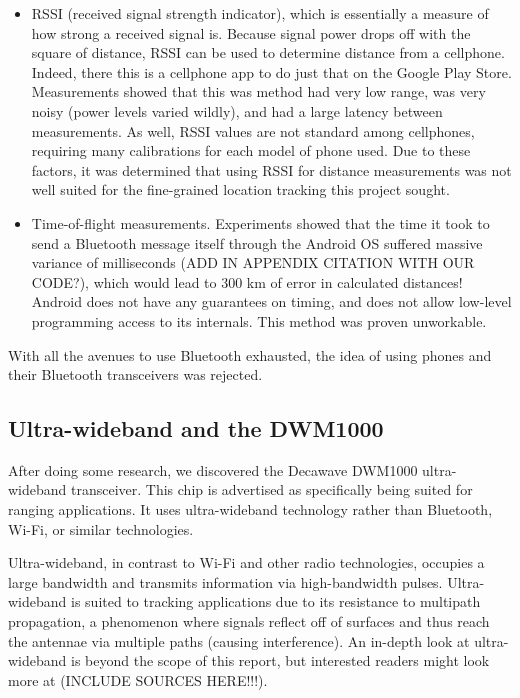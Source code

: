\begin{itemize}
	\item RSSI (received signal strength indicator), which is essentially a measure of how strong a received signal is. Because signal power drops off with the square of distance, RSSI can be used to determine distance from a cellphone. Indeed, there this is a cellphone app to do just that on the Google Play Store. Measurements showed that this was method had very low range, was very noisy (power levels varied wildly), and had a large latency between measurements. As well, RSSI values are not standard among cellphones, requiring many calibrations for each model of phone used. Due to these factors, it was determined that using RSSI for distance measurements was not well suited for the fine-grained location tracking this project sought. 
	\item Time-of-flight measurements. Experiments showed that the time it took to send a Bluetooth message itself through the Android OS suffered massive variance of milliseconds (ADD IN APPENDIX CITATION WITH OUR CODE?), which would lead to 300 km of error in calculated distances! Android does not have any guarantees on timing, and does not allow low-level programming access to its internals. This method was proven unworkable.
\end{itemize}

With all the avenues to use Bluetooth exhausted, the idea of using phones and their Bluetooth transceivers was rejected.

\subsection{Ultra-wideband and the DWM1000}
After doing some research, we discovered the Decawave DWM1000 ultra-wideband transceiver. This chip is advertised as specifically being suited for ranging applications. It uses ultra-wideband technology rather than Bluetooth, Wi-Fi, or similar technologies.

Ultra-wideband, in contrast to Wi-Fi and other radio technologies, occupies a large bandwidth and transmits information via high-bandwidth pulses. Ultra-wideband is suited to tracking applications due to its resistance to multipath propagation, a phenomenon where signals reflect off of surfaces and thus reach the antennae via multiple paths (causing interference). An in-depth look at ultra-wideband is beyond the scope of this report, but interested readers might look more at (INCLUDE SOURCES HERE!!!).

